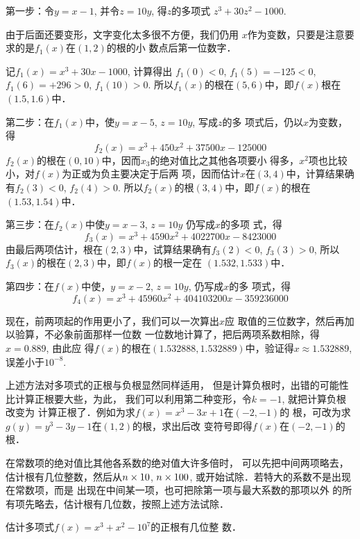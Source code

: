 \begin{solution}
第一步：令$y=x-1$, 并令$z=10y$, 得$z$的多项式
$z^3+30z^2-1000$.

由于后面还要变形，文字变化太多很不方便，我们仍用
$x$作为变数，只要是注意要求的是$f_1(x)$在$(1,2)$的根的小
数点后第一位数字．

记$f_1(x)=x^3+30x-1000$, 计算得出
$f_1(0)<0$, $f_1(5)=-125<0$, $f_1(6)=+296>0$, $f_1(10)>0$.
所以$f_1(x)$的根在$(5,6)$中，即$f(x)$根在$(1.5,1.6)$中．

第二步：在$f_1(x)$中，使$y=x-5$, $z=10y$, 写成$z$的多
项式后，仍以$x$为变数，得
\[f_2(x)=x^3+450x^2+37500x-125000\]
$f_2(x)$的根在$(0,10)$中，因而$x_3$的绝对值比之其他各项要小
得多，$x^2$项也比较小，对$f(x)$为正或为负主要决定于后两
项，因而估计$x$在$(3,4)$中，计算结果确有$f_2(3)<0$, 
$f_2(4)>0$. 所以$f_2(x)$的根$(3,4)$中，即$f(x)$的根在
$(1.53,1.54)$中．

第三步：在$f_2(x)$中使$y=x-3$, $z=10y$ 仍写成$x$的多项
式，得
\[f_3(x)=x^3+4590x^2+4022700x-8423000\]
由最后两项估计，根在$(2,3)$中，试算结果确有$f_3(2)<0$, 
$f_3(3)>0$, 所以$f_3(x)$的根在$(2,3)$中，即$f(x)$的根一定在
$(1.532,1.533)$中．

第四步：在$f(x)$中使，$y=x-2$, $z=10y$, 仍写成$x$的多
项式，得
\[f_4(x)=x^3+45960x^2+404103200x-359236000\]

现在，前两项起的作用更小了，我们可以一次算出$x$应
取值的三位数字，然后再加以验算，不必象前面那样一位数
一位数地计算了，把后两项系数相除，得$x=0.889$, 由此应
得$f(x)$的根在$(1.532888,1.532889)$中，验证得$x\approx 1.532889$,
误差小于$10^{-8}$.
\end{solution}

\begin{rmk}
    上述方法对多项式的正根与负根显然同样适用，
但是计算负根时，出错的可能性比计算正根要大些，为此，
我们可以利用第二种变形，令$k=-1$, 就把计算负根改变为
计算正根了．例如为求$f(x)=x^3-3x+1$在$(-2,-1)$的
根，可改为求$g(y)=y^3-3y-1$在$(1,2)$的根，求出后改
变符号即得$f(x)$在$(-2,-1)$的根．

在常数项的绝对值比其他各系数的绝对值大许多倍时，
可以先把中间两项略去，估计根有几位整数，然后从$n\times10$,
$n\times100$, 或开始试除．若特大的系数不是出现在常数项，而是
出现在中间某一项，也可把除第一项与最大系数的那项以外
的所有项先略去，估计根有几位数，按照上述方法试除．
\end{rmk}

\begin{example}
    估计多项式$f(x)=x^3+x^2-10^7$的正根有几位整
数．
\end{example}

